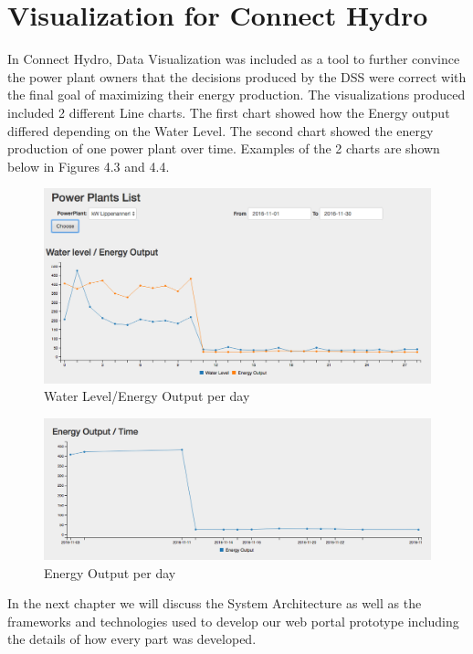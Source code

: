 \section{Visualization for Connect Hydro}
In Connect Hydro, Data Visualization was included as a tool to further convince the power plant owners that the decisions produced by the DSS were correct with the final goal of maximizing their energy production. The visualizations produced included 2 different Line charts. The first chart showed how the Energy output differed depending on the Water Level. The second chart showed the energy production of one power plant over time. Examples of the 2 charts are shown below in Figures 4.3 and 4.4.
\begin{figure}[H]
\centering
\includegraphics[scale=0.4]{Images/Chart1.png}
\caption[Water Level/Energy Output per day]{Water Level/Energy Output per day}
\end{figure}
\begin{figure}[H]
\centering
\includegraphics[scale=0.4]{Images/Chart2.png}
\caption[Energy Output per day]{Energy Output per day}
\end{figure}
In the next chapter we will discuss the System Architecture as well as the frameworks and technologies used to develop our web portal prototype including the details of how every part was developed.
